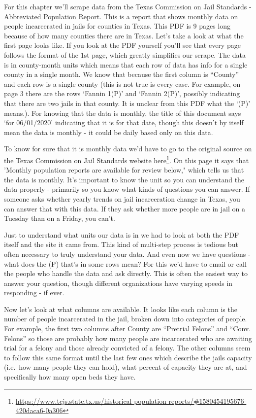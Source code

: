 \documentclass[
]{krantz}
\renewcommand{\href}[2]{#2\footnote{\url{#1}}}
\begin{document}
For this chapter we'll scrape data from the Texas Commission on Jail Standards - Abbreviated Population Report. This is a report that shows monthly data on people incarcerated in jails for counties in Texas. This PDF is 9 pages long because of how many counties there are in Texas. Let's take a look at what the first page looks like. If you look at the PDF yourself you'll see that every page follows the format of the 1st page, which greatly simplifies our scrape. The data is in county-month units which means that each row of data has info for a single county in a single month. We know that because the first column is ``County'' and each row is a single county (this is not true is every case. For example, on page 3 there are the rows `Fannin 1(P)' and `Fannin 2(P)', possibly indicating that there are two jails in that county. It is unclear from this PDF what the `(P)' means.). For knowing that the data is monthly, the title of this document says `for 06/01/2020' indicating that it is for that date, though this doesn't by itself mean the data is monthly - it could be daily based only on this data.

To know for sure that it is monthly data we'd have to go to the original source on the Texas Commission on Jail Standards website \href{https://www.tcjs.state.tx.us/historical-population-reports/\#1580454195676-420daca6-0a306}{here}. On this page it says that 'Monthly population reports are available for review below," which tells us that the data is monthly. It's important to know the unit so you can understand the data properly - primarily so you know what kinds of questions you can answer. If someone asks whether yearly trends on jail incarceration change in Texas, you can answer that with this data. If they ask whether more people are in jail on a Tuesday than on a Friday, you can't.

Just to understand what units our data is in we had to look at both the PDF itself and the site it came from. This kind of multi-step process is tedious but often necessary to truly understand your data. And even now we have questions - what does the (P) that's in some rows mean? For this we'd have to email or call the people who handle the data and ask directly. This is often the easiest way to answer your question, though different organizations have varying speeds in responding - if ever.

Now let's look at what columns are available. It looks like each column is the number of people incarcerated in the jail, broken down into categories of people. For example, the first two columns after County are ``Pretrial Felons'' and ``Conv. Felons'' so those are probably how many people are incarcerated who are awaiting trial for a felony and those already convicted of a felony. The other columns seem to follow this same format until the last few ones which describe the jails capacity (i.e.~how many people they can hold), what percent of capacity they are at, and specifically how many open beds they have.
\end{document}
